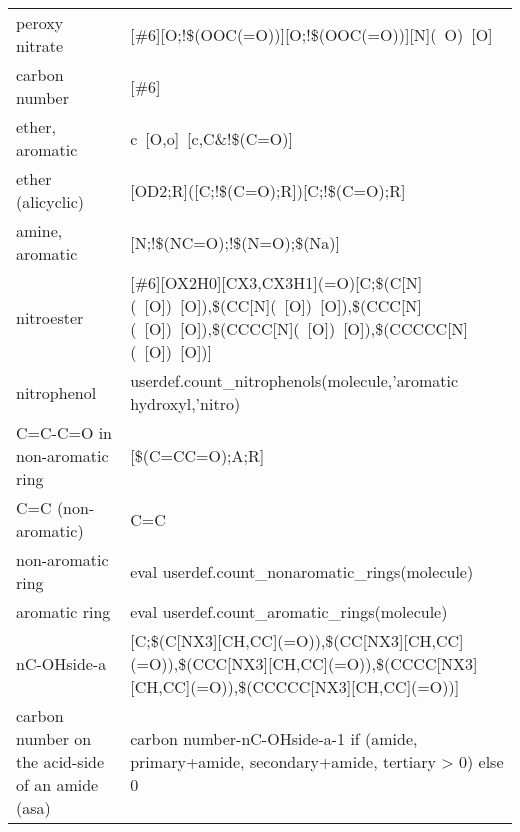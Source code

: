 \begin{tabular}{ll}
peroxy nitrate & [\#6][O;!\$(OOC(=O))][O;!\$(OOC(=O))][N](~O)~[O] \\
carbon number & [\#6] \\
ether, aromatic & c~[O,o]~[c,C\&!\$(C=O)] \\
ether (alicyclic) & [OD2;R]([C;!\$(C=O);R])[C;!\$(C=O);R] \\
amine, aromatic & [N;!\$(NC=O);!\$(N=O);\$(Na)] \\
nitroester & [\#6][OX2H0][CX3,CX3H1](=O)[C;\$(C[N](~[O])~[O]),\$(CC[N](~[O])~[O]),\$(CCC[N](~[O])~[O]),\$(CCCC[N](~[O])~[O]),\$(CCCCC[N](~[O])~[O])] \\
nitrophenol & userdef.count_nitrophenols(molecule,'{aromatic hydroxyl},'{nitro}) \\
C=C-C=O in non-aromatic ring & [\$(C=CC=O);A;R] \\
C=C (non-aromatic) & C=C \\
non-aromatic ring & eval userdef.count_nonaromatic_rings(molecule) \\
aromatic ring & eval userdef.count_aromatic_rings(molecule) \\
nC-OHside-a & [C;\$(C[NX3][CH,CC](=O)),\$(CC[NX3][CH,CC](=O)),\$(CCC[NX3][CH,CC](=O)),\$(CCCC[NX3][CH,CC](=O)),\$(CCCCC[NX3][CH,CC](=O))] \\
carbon number on the acid-side of an amide (asa) & {carbon number}-{nC-OHside-a}-1 if ({amide, primary}+{amide, secondary}+{amide, tertiary} > 0) else 0 \\
\bottomrule
\end{tabular}
